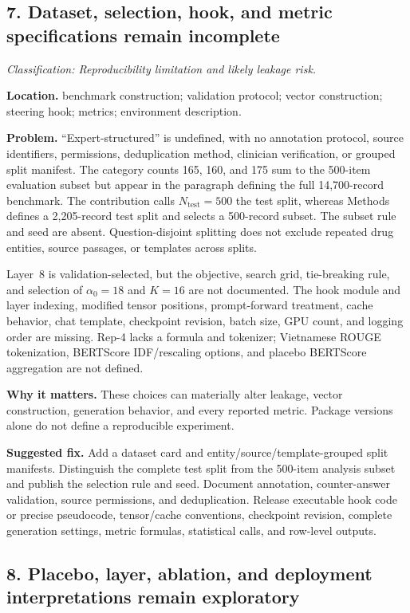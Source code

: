 \documentclass[11pt]{article}
\newcommand{\findinglabel}[1]{\textbf{#1}}
\newcommand{\classification}[1]{\textit{Classification: #1.}}
\begin{document}
\subsection*{7. Dataset, selection, hook, and metric specifications remain incomplete}

\classification{Reproducibility limitation and likely leakage risk}

\findinglabel{Location.} benchmark construction; validation protocol; vector construction; steering hook; metrics; environment description.

\findinglabel{Problem.} ``Expert-structured'' is undefined, with no annotation protocol, source identifiers, permissions, deduplication method, clinician verification, or grouped split manifest.  The category counts 165, 160, and 175 sum to the 500-item evaluation subset but appear in the paragraph defining the full 14,700-record benchmark.  The contribution calls $N_{\text{test}}=500$ the test split, whereas Methods defines a 2,205-record test split and selects a 500-record subset.  The subset rule and seed are absent.  Question-disjoint splitting does not exclude repeated drug entities, source passages, or templates across splits.

Layer~8 is validation-selected, but the objective, search grid, tie-breaking rule, and selection of $\alpha_0=18$ and $K=16$ are not documented.  The hook module and layer indexing, modified tensor positions, prompt-forward treatment, cache behavior, chat template, checkpoint revision, batch size, GPU count, and logging order are missing.  Rep-4 lacks a formula and tokenizer; Vietnamese ROUGE tokenization, BERTScore IDF/rescaling options, and placebo BERTScore aggregation are not defined.

\findinglabel{Why it matters.} These choices can materially alter leakage, vector construction, generation behavior, and every reported metric.  Package versions alone do not define a reproducible experiment.

\findinglabel{Suggested fix.} Add a dataset card and entity/source/template-grouped split manifests.  Distinguish the complete test split from the 500-item analysis subset and publish the selection rule and seed.  Document annotation, counter-answer validation, source permissions, and deduplication.  Release executable hook code or precise pseudocode, tensor/cache conventions, checkpoint revision, complete generation settings, metric formulas, statistical calls, and row-level outputs.

\subsection*{8. Placebo, layer, ablation, and deployment interpretations remain exploratory}
\end{document}

